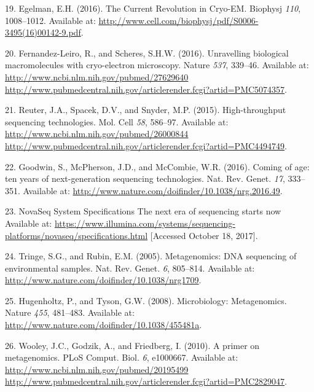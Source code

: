 \documentclass[11pt,a4paper,twoside]{book}
\theoremstyle{definition}
\theoremstyle{definition}
\theoremstyle{remark}
\begin{document}
\hypertarget{ref-Egelman2016}{}
19. Egelman, E.H. (2016). The Current Revolution in Cryo-EM. Biophysj
\emph{110}, 1008--1012. Available at:
\url{http://www.cell.com/biophysj/pdf/S0006-3495(16)00142-9.pdf}.

\hypertarget{ref-Fernandez-Leiro2016}{}
20. Fernandez-Leiro, R., and Scheres, S.H.W. (2016). Unravelling
biological macromolecules with cryo-electron microscopy. Nature
\emph{537}, 339--46. Available at:
\href{http://www.ncbi.nlm.nih.gov/pubmed/27629640\%20http://www.pubmedcentral.nih.gov/articlerender.fcgi?artid=PMC5074357}{http://www.ncbi.nlm.nih.gov/pubmed/27629640 http://www.pubmedcentral.nih.gov/articlerender.fcgi?artid=PMC5074357}.

\hypertarget{ref-Reuter2015}{}
21. Reuter, J.A., Spacek, D.V., and Snyder, M.P. (2015). High-throughput
sequencing technologies. Mol. Cell \emph{58}, 586--97. Available at:
\href{http://www.ncbi.nlm.nih.gov/pubmed/26000844\%20http://www.pubmedcentral.nih.gov/articlerender.fcgi?artid=PMC4494749}{http://www.ncbi.nlm.nih.gov/pubmed/26000844 http://www.pubmedcentral.nih.gov/articlerender.fcgi?artid=PMC4494749}.

\hypertarget{ref-Goodwin2016}{}
22. Goodwin, S., McPherson, J.D., and McCombie, W.R. (2016). Coming of
age: ten years of next-generation sequencing technologies. Nat. Rev.
Genet. \emph{17}, 333--351. Available at:
\url{http://www.nature.com/doifinder/10.1038/nrg.2016.49}.

\hypertarget{ref-NovaSeqSystemSpecifications}{}
23. NovaSeq System Specifications \textbar{} The next era of sequencing
starts now Available at:
\url{https://www.illumina.com/systems/sequencing-platforms/novaseq/specifications.html}
{[}Accessed October 18, 2017{]}.

\hypertarget{ref-Tringe2005}{}
24. Tringe, S.G., and Rubin, E.M. (2005). Metagenomics: DNA sequencing
of environmental samples. Nat. Rev. Genet. \emph{6}, 805--814. Available
at: \url{http://www.nature.com/doifinder/10.1038/nrg1709}.

\hypertarget{ref-Hugenholtz2008}{}
25. Hugenholtz, P., and Tyson, G.W. (2008). Microbiology: Metagenomics.
Nature \emph{455}, 481--483. Available at:
\url{http://www.nature.com/doifinder/10.1038/455481a}.

\hypertarget{ref-Wooley2010}{}
26. Wooley, J.C., Godzik, A., and Friedberg, I. (2010). A primer on
metagenomics. PLoS Comput. Biol. \emph{6}, e1000667. Available at:
\href{http://www.ncbi.nlm.nih.gov/pubmed/20195499\%20http://www.pubmedcentral.nih.gov/articlerender.fcgi?artid=PMC2829047}{http://www.ncbi.nlm.nih.gov/pubmed/20195499 http://www.pubmedcentral.nih.gov/articlerender.fcgi?artid=PMC2829047}.
\end{document}

